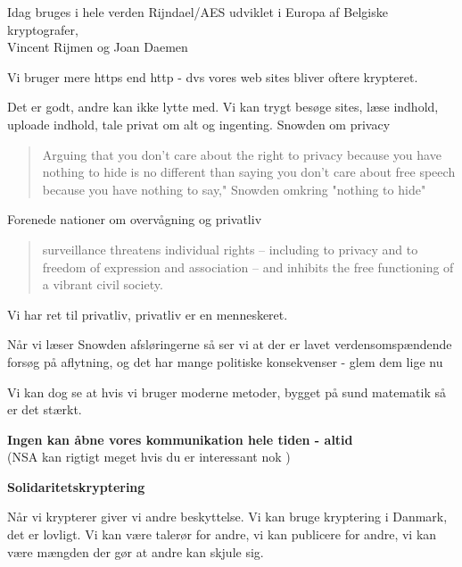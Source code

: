 \documentclass[20pt,landscape,a4paper,footrule]{foils}
\begin{document}

Idag bruges i hele verden Rijndael/AES udviklet i Europa af Belgiske kryptografer, \\
Vincent Rijmen og Joan Daemen



Vi bruger mere https end http - dvs vores web sites bliver oftere krypteret.

Det er godt, andre kan ikke lytte med. Vi kan trygt besøge sites, læse indhold, uploade indhold, tale privat om alt og ingenting.
Snowden om privacy
\begin{quote}
 Arguing that you don't care about the right to privacy because you have nothing to hide is no different than saying you don't care about free speech because you
have nothing to say," Snowden omkring "nothing to hide"
\end{quote}

Forenede nationer om overvågning og privatliv
\begin{quote} surveillance threatens individual rights – including to privacy and
 to freedom of expression and association – and inhibits the free
 functioning of a vibrant civil society.
\end{quote}

\centerline{Vi har ret til privatliv, privatliv er en menneskeret.}





Når vi læser Snowden afsløringerne så ser vi at der er lavet verdensomspændende
forsøg på aflytning, og det har mange politiske konsekvenser - glem dem lige nu

Vi kan dog se at hvis vi bruger moderne metoder, bygget på sund matematik så er det stærkt.

{\bf Ingen kan åbne vores kommunikation hele tiden - altid}\\
(NSA kan rigtigt meget hvis du er interessant nok )

{\bf Solidaritetskryptering}

Når vi krypterer giver vi andre beskyttelse. Vi kan bruge kryptering i Danmark, det er lovligt. Vi kan være talerør for andre, vi kan publicere for andre, vi kan være mængden der gør at andre kan skjule sig.
\end{document}
